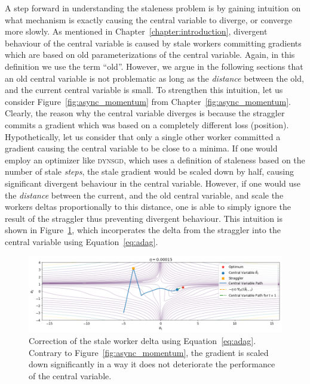 A step forward in understanding the staleness problem is by gaining intuition on what mechanism is exactly causing the central variable to diverge, or converge more slowly. As mentioned in Chapter~\ref{chapter:introduction}, divergent behaviour of the central variable is caused by stale workers committing gradients which are based on old parameterizations of the central variable. Again, in this definition we use the term ``old''. However, we argue in the following sections that an old central variable is not problematic as long as the \emph{distance} between the old, and the current central variable is small. To strengthen this intuition, let us consider Figure~\ref{fig:async_momentum} from Chapter~\ref{fig:async_momentum}. Clearly, the reason why the central variable diverges is because the straggler commits a gradient which was based on a completely different loss (position). Hypothetically, let us consider that only a single other worker committed a gradient causing the central variable to be close to a minima. If one would employ an optimizer like \textsc{dynsgd}, which uses a definition of staleness based on the number of stale \emph{steps}, the stale gradient would be scaled down by half, causing significant divergent behaviour in the central variable. However, if one would use the \emph{distance} between the current, and the old central variable, and scale the workers deltas proportionally to this distance, one is able to simply ignore the result of the straggler thus preventing divergent behaviour. This intuition is shown in Figure~\ref{fig:adag_straggler_corrected}, which incorperates the delta from the straggler into the central variable using Equation~\ref{eq:adag}.\\

\begin{figure}[H]
  \centering
  \includegraphics[width=\textwidth]{resources/images/async_straggler_corrected_adag}
  \caption{Correction of the stale worker delta using Equation~\ref{eq:adag}. Contrary to Figure~\ref{fig:async_momentum}, the gradient is scaled down significantly in a way it does not deteriorate the performance of the central variable.}
  \label{fig:adag_straggler_corrected}
\end{figure}

